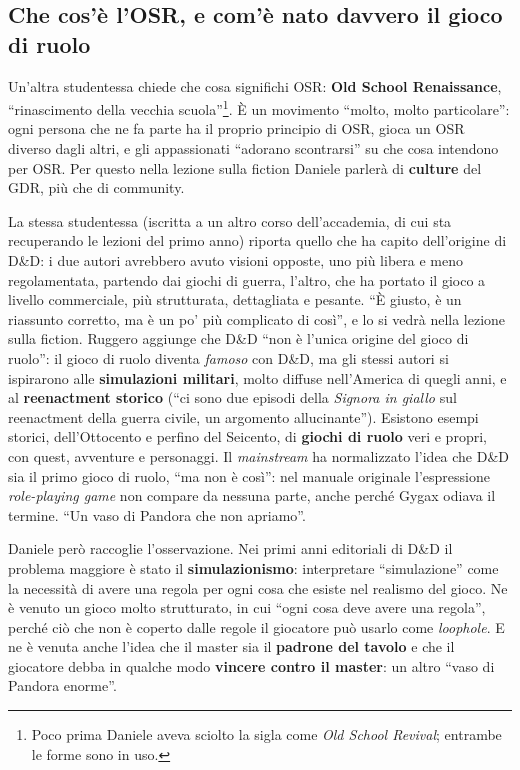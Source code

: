 \subsection{Che cos'è l'OSR, e com'è nato davvero il gioco di ruolo}

Un'altra studentessa chiede che cosa significhi OSR: \textbf{Old School
Renaissance}, ``rinascimento della vecchia scuola''\footnote{Poco prima Daniele
aveva sciolto la sigla come \emph{Old School Revival}; entrambe le forme sono in
uso.}. È un movimento ``molto, molto particolare'': ogni persona che ne fa parte
ha il proprio principio di OSR, gioca un OSR diverso dagli altri, e gli
appassionati ``adorano scontrarsi'' su che cosa intendono per OSR. Per questo
nella lezione sulla fiction Daniele parlerà di \textbf{culture} del GDR, più che
di community.

La stessa studentessa (iscritta a un altro corso dell'accademia, di cui sta
recuperando le lezioni del primo anno) riporta quello che ha capito dell'origine
di D\&D: i due autori avrebbero avuto visioni opposte, uno più libera e meno
regolamentata, partendo dai giochi di guerra, l'altro, che ha portato il gioco a
livello commerciale, più strutturata, dettagliata e pesante. ``È giusto, è un
riassunto corretto, ma è un po' più complicato di così'', e lo si vedrà nella
lezione sulla fiction. Ruggero aggiunge che D\&D ``non è l'unica origine del
gioco di ruolo'': il gioco di ruolo diventa \emph{famoso} con D\&D, ma gli stessi
autori si ispirarono alle \textbf{simulazioni militari}, molto diffuse
nell'America di quegli anni, e al \textbf{reenactment storico} (``ci sono due
episodi della \emph{Signora in giallo} sul reenactment della guerra civile, un
argomento allucinante''). Esistono esempi storici, dell'Ottocento e perfino del
Seicento, di \textbf{giochi di ruolo} veri e propri, con quest, avventure e
personaggi. Il \emph{mainstream} ha normalizzato l'idea che D\&D sia il primo
gioco di ruolo, ``ma non è così'': nel manuale originale l'espressione
\emph{role-playing game} non compare da nessuna parte, anche perché Gygax
odiava il termine. ``Un vaso di Pandora che non apriamo''.

Daniele però raccoglie l'osservazione. Nei primi anni editoriali di D\&D il
problema maggiore è stato il \textbf{simulazionismo}: interpretare
``simulazione'' come la necessità di avere una regola per ogni cosa che esiste nel
realismo del gioco. Ne è venuto un gioco molto strutturato, in cui ``ogni cosa
deve avere una regola'', perché ciò che non è coperto dalle regole il giocatore
può usarlo come \emph{loophole}. E ne è venuta anche l'idea che il master sia il
\textbf{padrone del tavolo} e che il giocatore debba in qualche modo
\textbf{vincere contro il master}: un altro ``vaso di Pandora enorme''.

